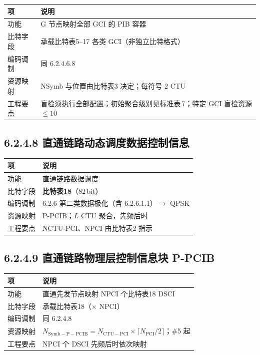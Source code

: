 \documentclass[11pt,a4paper]{ctexart}
\begin{document}
\begin{table}[h]
\centering
\small
\begin{tabular}{L{2.2cm}L{10.8cm}}
\toprule
\textbf{项} & \textbf{说明} \\
\midrule
功能 & G 节点映射全部 GCI 的 PIB 容器 \\
比特字段 & 承载比特表5--17 各类 GCI（非独立比特格式） \\
编码调制 & 同 6.2.4.6.8 \\
资源映射 & NSymb 与位置由比特表3 决定；每符号 2 CTU \\
工程要点 & 盲检须执行全部配置；初始聚合级别见标准表\,7；特定 GCI 盲检资源 $\leq 10$ \\
\bottomrule
\end{tabular}
\end{table}

\subsection{6.2.4.8 直通链路动态调度数据控制信息}

\begin{table}[h]
\centering
\small
\begin{tabular}{L{2.2cm}L{10.8cm}}
\toprule
\textbf{项} & \textbf{说明} \\
\midrule
功能 & 直通链路数据调度 \\
比特字段 & \textbf{比特表18}（82\,bit） \\
编码调制 & 6.2.6 第二类数据极化（含 6.2.6.1.1）$\rightarrow$ QPSK \\
资源映射 & P-PCIB；$L$ CTU 聚合，先频后时 \\
工程要点 & NCTU-PCI、NPCI 由比特表2 指示 \\
\bottomrule
\end{tabular}
\end{table}

\subsection{6.2.4.9 直通链路物理层控制信息块 P-PCIB}

\begin{table}[h]
\centering
\small
\begin{tabular}{L{2.2cm}L{10.8cm}}
\toprule
\textbf{项} & \textbf{说明} \\
\midrule
功能 & 直通先发节点映射 NPCI 个比特表18 DSCI \\
比特字段 & 承载比特表18（$\times$ NPCI） \\
编码调制 & 同 6.2.4.8 \\
资源映射 & $N_{\mathrm{Symb-P-PCIB}}=N_{\mathrm{CTU-PCI}}\times\lceil N_{\mathrm{PCI}}/2\rceil$；\#5 起 \\
工程要点 & NPCI 个 DSCI 先频后时依次映射 \\
\bottomrule
\end{tabular}
\end{table}
\end{document}
